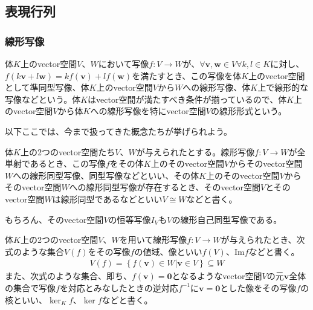 \documentclass[dvipdfmx]{jsarticle}
\begin{document}
\subsection{表現行列}%
\subsubsection{線形写像}%
\begin{dfn*}
体$K$上のvector空間$V$、$W$において写像$f:V \rightarrow W$が、$\forall\mathbf{v},\mathbf{w} \in V\forall k,l \in K$に対し、$f\left( k\mathbf{v} + l\mathbf{w} \right) = kf\left( \mathbf{v} \right) + lf\left( \mathbf{w} \right)$を満たすとき、この写像を体$K$上のvector空間として準同型写像、体$K$上のvector空間$V$から$W$への線形写像、体$K$上で線形的な写像などという。体$K$はvector空間が満たすべき条件が揃っているので、体$K$上のvector空間$V$から体$K$への線形写像を特にvector空間$V$の線形形式という。
\end{dfn*}\par
以下ここでは、今まで扱ってきた概念たちが挙げられよう。
\begin{dfn*}
体$K$上の2つのvector空間たち$V$、$W$が与えられたとする。線形写像$f:V \rightarrow W$が全単射であるとき、この写像$f$をその体$K$上のそのvector空間$V$からそのvector空間$W$への線形同型写像、同型写像などといい、その体$K$上のそのvector空間$V$からそのvector空間$W$への線形同型写像が存在するとき、そのvector空間$V$とそのvector空間$W$は線形同型であるなどといい$V \cong W$などと書く。
\end{dfn*}\par
もちろん、そのvector空間$V$の恒等写像$I_{V}もV$の線形自己同型写像である。
\begin{dfn*}
体$K$上の2つのvector空間$V$、$W$を用いて線形写像$f:V \rightarrow W$が与えられたとき、次式のような集合$V(f)$をその写像$f$の値域、像といい$f(V)$、$\mathrm{Im}f$などと書く。
\begin{align*}
V(f) = \left\{ f\left( \mathbf{v} \right) \in W|\mathbf{v} \in V \right\} \subseteq W
\end{align*}
また、次式のような集合、即ち、$f\left( \mathbf{v} \right) = \mathbf{0}$となるようなvector空間$V$の元$\mathbf{v}$全体の集合で写像$f$を対応とみなしたときの逆対応$f^{- 1}$に$\mathbf{v} = \mathbf{0}$とした像をその写像$f$の核といい、$\ker_{K}f$、$\ker f$などと書く。
\end{dfn*}
\end{document}
